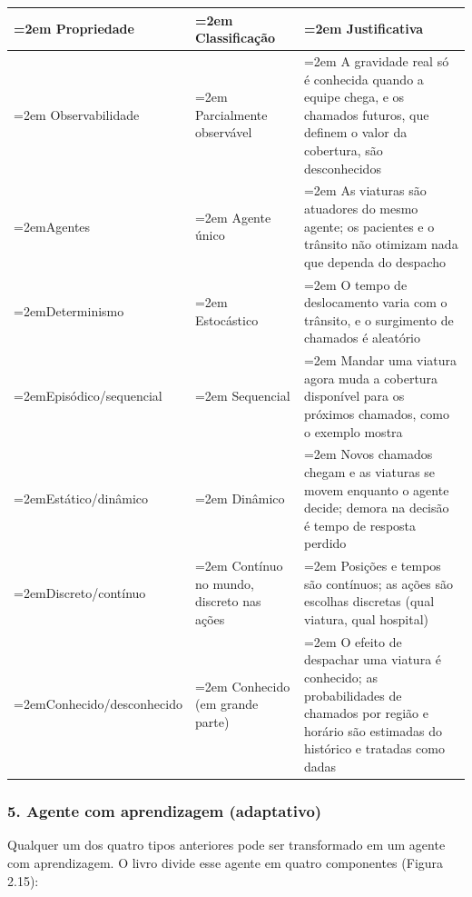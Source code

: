 \documentclass[12pt, a4paper]{article}
\begin{document}
\begingroup
\setlength{\tabcolsep}{4.0pt}
\begin{longtable}{@{}>{\raggedright\hyphenpenalty=30\tolerance=999\emergencystretch=2em\arraybackslash}p{4.51cm}>{\raggedright\hyphenpenalty=30\tolerance=999\emergencystretch=2em\arraybackslash}p{2.90cm}>{\raggedright\hyphenpenalty=30\tolerance=999\emergencystretch=2em\arraybackslash}p{7.31cm}@{}}
\toprule\noalign{}
Propriedade & Clas\-si\-fi\-ca\-ção & Justificativa \\
\midrule\noalign{}
\endhead
\bottomrule\noalign{}
\endlastfoot
Observabilidade & Parcialmente ob\-ser\-vá\-vel & A gravidade real só é conhecida quando a equipe chega, e os chamados futuros, que definem o valor da cobertura, são desconhecidos \\
Agentes & Agente único & As viaturas são atuadores do mesmo agente; os pacientes e o trânsito não otimizam nada que dependa do despacho \\
Determinismo & Es\-to\-cás\-tico & O tempo de deslocamento varia com o trânsito, e o surgimento de chamados é aleatório \\
Episódico\slash sequencial & Sequencial & Mandar uma viatura agora muda a cobertura dis\-po\-ní\-vel para os próximos chamados, como o exemplo mostra \\
Estático\slash dinâmico & Dinâmico & Novos chamados chegam e as viaturas se movem enquanto o agente decide; demora na decisão é tempo de resposta perdido \\
Discreto\slash contínuo & Contínuo no mundo, discreto nas ações & Posições e tempos são contínuos; as ações são escolhas discretas (qual viatura, qual hospital\allowbreak ) \\
Conhecido\slash desconhecido & Conhecido (em grande parte\allowbreak ) & O efeito de despachar uma viatura é conhecido; as probabilidades de chamados por região e horário são estimadas do histórico e tratadas como dadas \\
\end{longtable}
\endgroup

\subsubsection{5. Agente com aprendizagem (adaptativo)}\label{5-agente-com-aprendizagem-adaptativo}

Qualquer um dos quatro tipos anteriores pode ser transformado em um agente com aprendizagem. O livro divide esse agente em quatro componentes (Figura 2.15):
\end{document}
